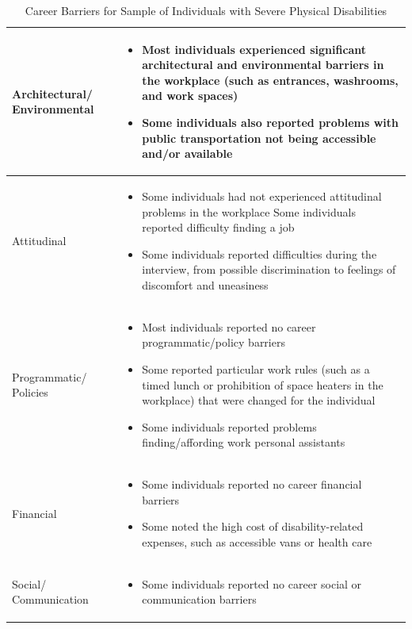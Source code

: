 \documentclass[11.5pt]{sig-alternate} %
\begin{document}
\begin{large}
\begin{table}[th]
\caption{Career Barriers for Sample of Individuals with Severe Physical Disabilities}
\begin{tabular}{|l|l|}
\hline
Architectural/ Environmental & 
\begin{itemize}[noitemsep, topsep=0pt, leftmargin=*]
\item Most individuals experienced significant architectural and environmental barriers in the workplace (such as entrances, washrooms, and work spaces)
\item Some individuals also reported problems with public transportation not being accessible and/or available
\end{itemize} \\ \hline
Attitudinal &
\begin{itemize}[noitemsep, topsep=0pt, leftmargin=*]
\item Some individuals had not experienced attitudinal problems in the workplace Some individuals reported difficulty finding a job
\item Some individuals reported difficulties during the interview, from possible discrimination to feelings of discomfort and uneasiness
\end{itemize} \\ \hline
Programmatic/ Policies &
\begin{itemize}[noitemsep, topsep=0pt, leftmargin=*]
\item Most individuals reported no career programmatic/policy barriers
\item Some reported particular work rules (such as a timed lunch or prohibition of space heaters in the workplace) that were changed for the individual
\item Some individuals reported problems finding/affording work personal assistants
\end{itemize} \\ \hline
Financial &
\begin{itemize}[noitemsep, topsep=0pt, leftmargin=*]
\item Some individuals reported no career financial barriers
\item Some noted the high cost of disability-related expenses, such as accessible vans or health care
\end{itemize} \\ \hline
Social/ Communication &
\begin{itemize}[noitemsep, topsep=0pt, leftmargin=*]
\item Some individuals reported no career social or communication barriers

\end{itemize}
\end{tabular}
\end{table}
\end{large}
\end{document}
